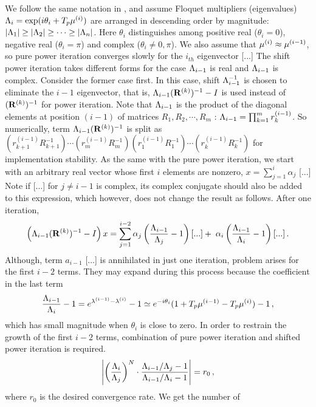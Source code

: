 \begin{description}
We follow the same notation in , and assume
Floquet multipliers (eigenvalues)
$\ExpaEig_{i} =\exp(i\theta_i+\period{p}\eigRe[i])$ are
arranged in descending order
by magnitude: $|\Lambda_{1}|\geq |\Lambda_{2}| \geq\cdots\geq
|\Lambda_{n}|$. Here $\theta_i$ distinguishes among positive real
($\theta_i=0$), negative real ($\theta_i=\pi$) and complex
($\theta_i\neq 0,\pi$).
We also assume that $\eigRe[i]\approx
\eigRe[i-1]$, so pure power iteration converges slowly for the $i_{th}$
eigenvector [...] %
The shift power iteration takes different forms for the case
$\Lambda_{i-1}$ is real and $\Lambda_{i-1}$ is complex. Consider the
former case first. In this case,  shift $\Lambda_{i-1}^{-1}$ is chosen
to eliminate the $i-1$ eigenvector, that is,
$\Lambda_{i-1}(\mathbf{R}^{(k)})^{-1} -I$
is used instead of $(\mathbf{R}^{(k)})^{-1}$ for power iteration. Note that
$\Lambda_{i-1}$ is the product of the diagonal elements at position
$(i-1)$ of matrices $R_1, R_2,\cdots,R_m$ :
$\Lambda_{i-1} = \prod_{k=1}^m r^{(i-1)}_k$.
So numerically,  term $\Lambda_{i-1}(\mathbf{R}^{(k)})^{-1}$
is split as
$(r^{(i-1)}_{k+1}R_{k+1}^{-1})\cdots
(r^{(i-1)}_mR_{m}^{-1})(r^{(i-1)}_1R_{1}^{-1})\cdots (r^{(i-1)}_kR_{k}^{-1})$
for implementation
stability. As the
same with the pure power iteration, we start with an arbitrary real vector
whose first $i$ elements are nonzero,
$ x=\sum_{j=1}^{i}\alpha_{j}$ [...] %
Note if [...] %
for $j\neq i-1$ is complex, its complex conjugate
should also be added to this expression, which however,
does not change the result as follows.
After one iteration,
\[
\left(\ExpaEig_{i-1}(\ps{R}{k})^{-1} -I\right)x
=
\sum_{j=1}^{i-2}\alpha_{j}\left(\frac{\ExpaEig_{i-1}}{\ExpaEig_{j}}-1\right) [...] %
+\;
\alpha_{i} \left(\frac{\ExpaEig_{i-1}}{\ExpaEig_{i}}-1\right) [...] %
\,.
\]
Although, term $a_{i-1}$  [...] %
is annihilated in just one iteration,
problem arises for the first $i-2$ terms. They may expand
during this process because the coefficient in the last term
\[
\frac{\ExpaEig_{i-1}}{\ExpaEig_{i}}-1 =
e^{\eigExp[i-1]-\eigExp[i]}-1\simeq e^{-i\theta_i}(1+\period{p}\eigRe[i-1]-
\period{p}\eigRe[i])-1
\,,
\]
which has small magnitude when $\theta_i$ is close to zero. In order
to restrain the growth of the first $i-2$ terms,
combination of pure power iteration and
shifted power iteration is required.
\[
\left|
\left(\frac{\Lambda_{i}}{\Lambda_{j}}\right)^{N}
\cdot
\frac{\Lambda_{i-1}/\Lambda_{j} - 1}{\Lambda_{i-1}/\Lambda_{i} - 1}
\right|=r_{0}
\,,
\]
where $r_{0}$ is the desired convergence rate. We get the number of

\end{description}
